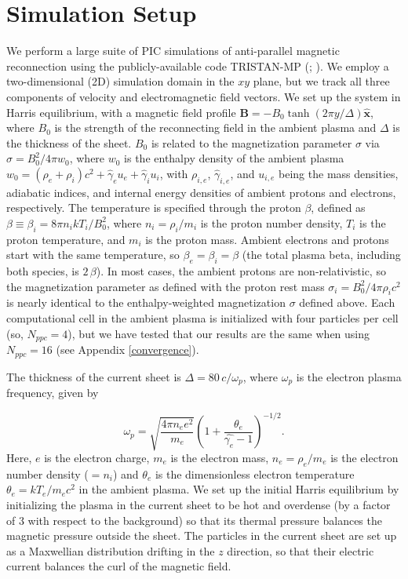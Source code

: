 \section{Simulation Setup}\label{setup}
We perform a large suite of PIC simulations of anti-parallel magnetic reconnection using the  publicly-available code TRISTAN-MP (\citealt{buneman93}; \citealt{spitkovsky05}).  We employ a two-dimensional (2D) simulation domain in the $xy$ plane, but we track all three components of velocity and electromagnetic field vectors.  We set up the system in Harris equilibrium, with a magnetic field profile $\bm{{B}} = -B_{0}\tanh{\left(2\pi y / \Delta\right)}\bm{\hat{x}}$, where $B_{0}$ is the strength of the reconnecting field in the ambient plasma and $\Delta$ is the thickness of the sheet.  $B_{0}$ is related to the magnetization parameter $\sigma$ via $\sigma=B_{0}^2 / 4\pi w_{0} $, where $w_{0}$ is the enthalpy density of the ambient plasma $w_0=(\rho_{e}+\rho_{i})c^{2}+ \hat{\gamma}_{e}u_{e}+ \hat{\gamma}_{i}u_{i}$, with $\rho_{i,e}$, $\hat{\gamma}_{i,e}$, and $u_{i,e}$ being the mass densities, adiabatic indices, and internal energy densities of ambient protons and electrons, respectively.  The temperature is specified through the proton $\beta$, defined as $\beta \equiv \beta_{i}=8 \pi n_{i} k T_{i}/B_{0}^{2}$, where $n_i=\rho_i/m_i$ is the proton number density, $T_i$ is the proton temperature, and $m_i$ is the proton mass. Ambient electrons and protons start with the same temperature, so $\beta_e=\beta_i=\beta$ (the total plasma beta, including both species, is $2\,\beta$). In most cases, the ambient protons are non-relativistic, so the magnetization parameter as defined with the proton rest mass $\sigma_i=B_0^2/4\pi \rho_i c^2$ is nearly identical to the enthalpy-weighted magnetization $\sigma$ defined above. Each computational cell in the ambient plasma is initialized with four particles per cell (so, $N_{ppc}=4$), but we have tested that our results are the same when using $N_{ppc}=16$ (see Appendix \ref{convergence}).

The thickness of the current sheet is $\Delta = 80 \,c/\omega_{p}$, where $\omega_{p}$ is the electron plasma frequency, given by 

\begin{equation}
\omega_{p} =\sqrt{\frac{4\pi n_{e}e^{2}}{m_{e}}}\left(1+\frac{\theta_{e}}{\hat{\gamma_{e}}-1}\right)^{-1/2}.
\label{electron skin depth}
\end{equation}
Here, $e$ is the electron charge, $m_e$ is the electron mass, $n_e=\rho_e/m_e$ is the electron number density ($=n_i$) and $\theta_{e}$ is the dimensionless electron temperature $\theta_{e}=kT_{e}/m_{e}c^{2}$ in the ambient plasma. 
We set up the initial Harris equilibrium by initializing the plasma in the current sheet to be hot and overdense (by a factor of 3 with respect to the background) so that its thermal pressure balances the magnetic pressure outside the sheet. The particles in the current sheet are set up as a Maxwellian distribution drifting in the $z$ direction, so that their electric current balances the curl of the magnetic field. 

